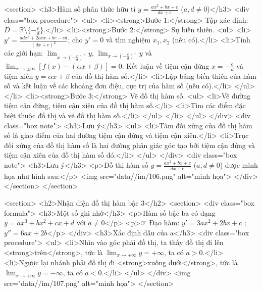    <section>
        <h3>Hàm số phân thức hữu tỉ \(y=\frac{ax^2+bx+c}{dx+e}\) (\(a, d \ne 0\))</h3>
        <div class="box procedure">
            <ul>
                <li><strong>Bước 1:</strong> Tập xác định: \(D=\mathbb{R} \setminus \{-\frac{e}{d}\}\).</li>
                <li><strong>Bước 2:</strong> Sự biến thiên.
                    <ul>
                        <li>\(y' = \frac{adx^2+2aex+be-cd}{(dx+e)^2}\); cho \(y'=0\) và tìm nghiệm \(x_1, x_2\) (nếu có).</li>
                        <li>Tính các giới hạn: \(\lim_{x \to (-\frac{e}{d})^+} y\), \(\lim_{x \to (-\frac{e}{d})^-} y\) và \(\lim_{x \to \pm\infty} [f(x)-(\alpha x + \beta)]=0\). Kết luận về tiệm cận đứng \(x=-\frac{e}{d}\) và tiệm xiên \(y=\alpha x + \beta\) của đồ thị hàm số.</li>
                        <li>Lập bảng biến thiên của hàm số và kết luận về các khoảng đơn điệu, cực trị của hàm số (nếu có).</li>
                    </ul>
                </li>
                <li><strong>Bước 3:</strong> Vẽ đồ thị hàm số.
                    <ul>
                        <li>Vẽ đường tiệm cận đứng, tiệm cận xiên của đồ thị hàm số.</li>
                        <li>Tìm các điểm đặc biệt thuộc đồ thị và vẽ đồ thị hàm số.</li>
                    </ul>
                </li>
            </ul>
        </div>
        <div class="box note">
            <h3>Lưu ý</h3>
            <ul>
                <li>Tâm đối xứng của đồ thị hàm số là giao điểm của hai đường tiệm cận đứng và tiệm cận xiên.</li>
                <li>Trục đối xứng của đồ thị hàm số là hai đường phân giác góc tạo bởi tiệm cận đứng và tiệm cận xiên của đồ thị hàm số đó.</li>
            </ul>
        </div>
        <div class="box note">
            <h3>Lưu ý</h3>
            <p>Đồ thị hàm số \(y=\frac{ax^2+bx+c}{dx+e}\) (\(a, d \ne 0\)) được minh họa như hình sau:</p>
            <img src="data//im/106.png" alt="minh họa">
        </div>
    </section>
</section>

<section>
    <h2>Nhận diện đồ thị hàm bậc 3</h2>
    <section>
        <div class="box formula">
            <h3>Một số ghi nhớ</h3>
            <p>Hàm số bậc ba có dạng \(y = ax^3 + bx^2 + cx + d\) với \(a \ne 0\)</p>
            <p>☞ Đạo hàm: \(y' = 3ax^2 + 2bx + c\) ; \(y'' = 6ax + 2b\)</p>
        </div>
        <h3>Xác định dấu của a</h3>
        <div class="box procedure">
            <ul>
                <li>Nhìn vào góc phải đồ thị, ta thấy đồ thị đi lên <strong>trên</strong>, tức là \(\lim_{x \to +\infty} y = +\infty\), ta có \(\boxed{a > 0}\).</li>
                <li>Ngược lại nhánh phải đồ thị đi <strong>xuống dưới</strong>, tức là \(\lim_{x \to +\infty} y = -\infty\), ta có \(\boxed{a < 0}\).</li>
            </ul>
        </div>
        <img src="data//im/107.png" alt="minh họa">
    </section>

